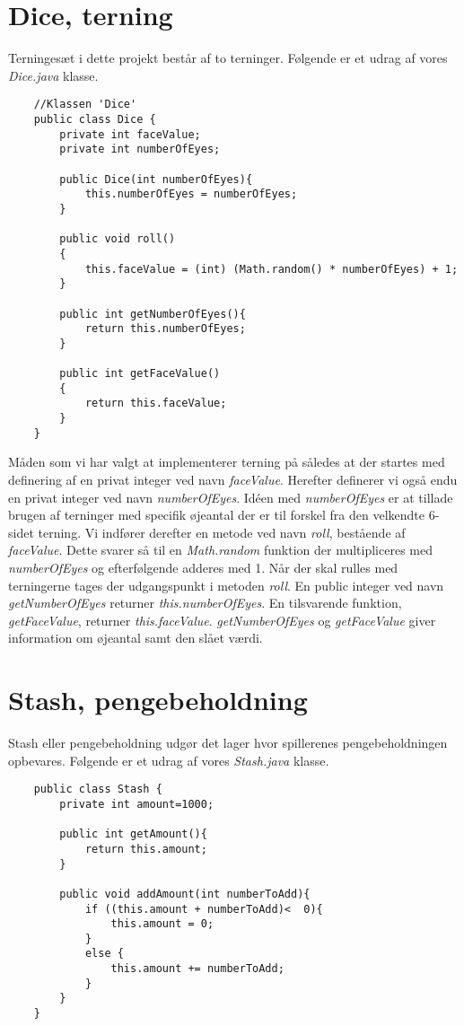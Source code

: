 \section{Dice, terning}
\noindent Terningesæt i dette projekt består af to terninger. 
Følgende er et udrag af vores \textit{Dice.java} klasse.\\
\begin{lstlisting}
    //Klassen 'Dice'    
    public class Dice {
        private int faceValue;
        private int numberOfEyes;

        public Dice(int numberOfEyes){
            this.numberOfEyes = numberOfEyes;
        }

        public void roll()
        {
            this.faceValue = (int) (Math.random() * numberOfEyes) + 1;
        }

        public int getNumberOfEyes(){
            return this.numberOfEyes;
        }

        public int getFaceValue()
        {
            return this.faceValue;
        }
    }
\end{lstlisting}
\vspace{2ex}

\noindent Måden som vi har valgt at implementerer terning på således at der startes med definering af en privat integer ved navn \textit{faceValue}.
Herefter definerer vi også endu en privat integer ved navn \textit{numberOfEyes}.
Idéen med \textit{numberOfEyes} er at tillade brugen af terninger med specifik øjeantal der er til forskel fra den velkendte 6-sidet terning.
Vi indfører derefter en metode ved navn \textit{roll}, bestående af \textit{faceValue}.
Dette svarer så til en \textit{Math.random} funktion der multipliceres med \textit{numberOfEyes} og efterfølgende adderes med 1.
Når der skal rulles med terningerne tages der udgangspunkt i metoden \textit{roll}.
En public integer ved navn \textit{getNumberOfEyes} returner \textit{this.numberOfEyes}.
En tilsvarende funktion, \textit{getFaceValue}, returner \textit{this.faceValue}.
\textit{getNumberOfEyes} og \textit{getFaceValue} giver information om øjeantal samt den slået værdi.\\

\section{Stash, pengebeholdning}
\noindent Stash eller pengebeholdning udgør det lager hvor spillerenes pengebeholdningen opbevares. 
Følgende er et udrag af vores \textit{Stash.java} klasse.\\
\begin{lstlisting}
    public class Stash {
        private int amount=1000;
    
        public int getAmount(){
            return this.amount;
        }
    
        public void addAmount(int numberToAdd){
            if ((this.amount + numberToAdd)<  0){
                this.amount = 0;
            }
            else {
                this.amount += numberToAdd;
            }
        }
    }
\end{lstlisting}
\vspace{2ex}

